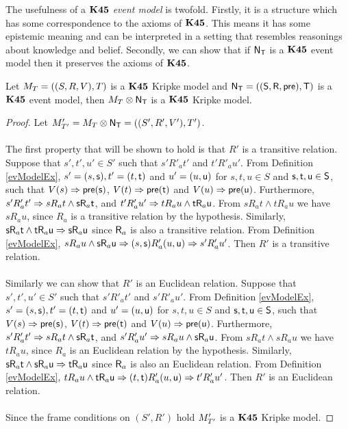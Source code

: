 The usefulness of a {\em $\bf K45$ event model} is twofold.
Firstly, it is a structure which has some correspondence to the axioms of $\bf K45$.
This means it has some epistemic meaning and can be interpreted in a setting that resembles
reasonings about knowledge and belief.
Secondly, we can show that if $\mathrm{\mathsf{N}}_\mathrm{\mathsf{T}}$ is a $\bf K45$ event model then it preserves the axioms of
$\bf K45$.

\begin{lemma} \label{lemma:k45preserved}
	Let $M_T = ((S,R,V),T)$ is a $\bf K45$ Kripke model and $\mathrm{\mathsf{N}}_\mathrm{\mathsf{T}} = ((\mathrm{\mathsf{S}},\mathrm{\mathsf{R}},\mathrm{\mathsf{pre}}),\mathrm{\mathsf{T}})$ is a $\bf K45$ event model, then
	$M_T \otimes \mathrm{\mathsf{N}}_\mathrm{\mathsf{T}}$ is a $\bf K45$ Kripke model.
\end{lemma}
\begin{proof}
	Let $M'_{T'} = M_T \otimes \mathrm{\mathsf{N}}_\mathrm{\mathsf{T}} = ((S',R',V'),T')$.\\
	\\
	The first property that will be shown to hold is that $R'$ is a transitive relation.
	Suppose that $s',t',u' \in S'$ such that $s' R'_a t'$ and $t' R'_a u'$.
	From Definition \ref{evModelEx}, $s' = (s,\mathrm{\mathsf{s}}), t' = (t,\mathrm{\mathsf{t}})$ and $u' = (u,\mathrm{\mathsf{u}})$ for $s,t,u \in
	S$ and $\mathrm{\mathsf{s}},\mathrm{\mathsf{t}},\mathrm{\mathsf{u}} \in \mathrm{\mathsf{S}}$, such that $V(s) \Rightarrow \mathrm{\mathsf{pre}}(\mathrm{\mathsf{s}})$, $V(t) \Rightarrow
	\mathrm{\mathsf{pre}}(\mathrm{\mathsf{t}})$ and $V(u) \Rightarrow \mathrm{\mathsf{pre}}(\mathrm{\mathsf{u}})$.
	Furthermore, $s' R'_a t' \Rightarrow s R_a t \land \mathrm{\mathsf{s}} \mathrm{\mathsf{R}}_a \mathrm{\mathsf{t}}$, and $t' R'_a u' \Rightarrow
	t R_a u \land \mathrm{\mathsf{t}} \mathrm{\mathsf{R}}_a \mathrm{\mathsf{u}}$.
	From $s R_a t \land t R_a u$ we have $s R_a u$, since $R_a$ is a transitive relation by the
	hypothesis.
	Similarly, $\mathrm{\mathsf{s}} \mathrm{\mathsf{R}}_a \mathrm{\mathsf{t}} \land \mathrm{\mathsf{t}} \mathrm{\mathsf{R}}_a \mathrm{\mathsf{u}} \Rightarrow \mathrm{\mathsf{s}} \mathrm{\mathsf{R}}_a \mathrm{\mathsf{u}}$ since $\mathrm{\mathsf{R}}_a$
	is also a transitive relation.
	From Definition \ref{evModelEx}, $s R_a u \land \mathrm{\mathsf{s}} \mathrm{\mathsf{R}}_a \mathrm{\mathsf{u}} \Rightarrow (s,\mathrm{\mathsf{s}}) R'_a (u,\mathrm{\mathsf{u}})
	\Rightarrow s' R'_a u'$.
	Then $R'$ is a transitive relation.\\
	\\
	Similarly we can show that $R'$ is an Euclidean relation.
	Suppose that $s',t',u' \in S'$ such that $s' R'_a t'$ and $s' R'_a u'$.
	From Definition \ref{evModelEx}, $s' = (s,\mathrm{\mathsf{s}}), t' = (t,\mathrm{\mathsf{t}})$ and $u' = (u,\mathrm{\mathsf{u}})$ for $s,t,u \in
	S$ and $\mathrm{\mathsf{s}},\mathrm{\mathsf{t}},\mathrm{\mathsf{u}} \in \mathrm{\mathsf{S}}$, such that $V(s) \Rightarrow \mathrm{\mathsf{pre}}(\mathrm{\mathsf{s}})$, $V(t) \Rightarrow
	\mathrm{\mathsf{pre}}(\mathrm{\mathsf{t}})$ and $V(u) \Rightarrow \mathrm{\mathsf{pre}}(\mathrm{\mathsf{u}})$.
	Furthermore, $s' R'_a t' \Rightarrow s R_a t \land \mathrm{\mathsf{s}} \mathrm{\mathsf{R}}_a \mathrm{\mathsf{t}}$, and $s' R'_a u' \Rightarrow
	s R_a u \land \mathrm{\mathsf{s}} \mathrm{\mathsf{R}}_a \mathrm{\mathsf{u}}$.
	From $s R_a t \land s R_a u$ we have $t R_a u$, since $R_a$ is an Euclidean relation by the
	hypothesis.
	Similarly, $\mathrm{\mathsf{s}} \mathrm{\mathsf{R}}_a \mathrm{\mathsf{t}} \land \mathrm{\mathsf{s}} \mathrm{\mathsf{R}}_a \mathrm{\mathsf{u}} \Rightarrow \mathrm{\mathsf{t}} \mathrm{\mathsf{R}}_a \mathrm{\mathsf{u}}$ since $\mathrm{\mathsf{R}}_a$
	is also an Euclidean relation.
	From Definition \ref{evModelEx}, $t R_a u \land \mathrm{\mathsf{t}} \mathrm{\mathsf{R}}_a \mathrm{\mathsf{u}} \Rightarrow (t,\mathrm{\mathsf{t}}) R'_a (u,\mathrm{\mathsf{u}})
	\Rightarrow t' R'_a u'$.
	Then $R'$ is an Euclidean relation.\\
	\\
	Since the frame conditions on $(S',R')$ hold $M'_{T'}$ is a $\bf K45$ Kripke model.
\end{proof}

